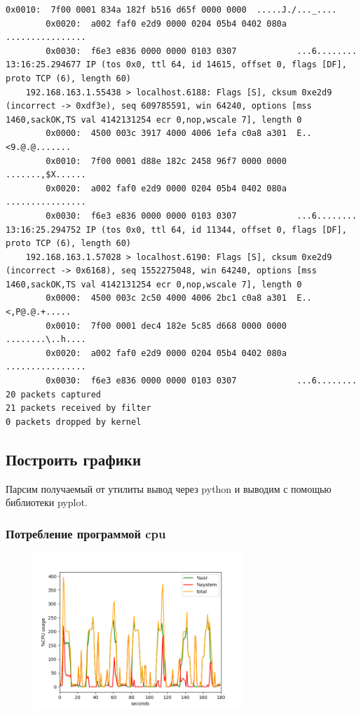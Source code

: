 \documentclass[11pt, a4paper]{article}
\begin{document}
\begin{Verbatim}[fontsize=\footnotesize,breaklines=true]
        0x0010:  7f00 0001 834a 182f b516 d65f 0000 0000  .....J./..._....
        0x0020:  a002 faf0 e2d9 0000 0204 05b4 0402 080a  ................
        0x0030:  f6e3 e836 0000 0000 0103 0307            ...6........
13:16:25.294677 IP (tos 0x0, ttl 64, id 14615, offset 0, flags [DF], proto TCP (6), length 60)
    192.168.163.1.55438 > localhost.6188: Flags [S], cksum 0xe2d9 (incorrect -> 0xdf3e), seq 609785591, win 64240, options [mss 1460,sackOK,TS val 4142131254 ecr 0,nop,wscale 7], length 0
        0x0000:  4500 003c 3917 4000 4006 1efa c0a8 a301  E..<9.@.@.......
        0x0010:  7f00 0001 d88e 182c 2458 96f7 0000 0000  .......,$X......
        0x0020:  a002 faf0 e2d9 0000 0204 05b4 0402 080a  ................
        0x0030:  f6e3 e836 0000 0000 0103 0307            ...6........
13:16:25.294752 IP (tos 0x0, ttl 64, id 11344, offset 0, flags [DF], proto TCP (6), length 60)
    192.168.163.1.57028 > localhost.6190: Flags [S], cksum 0xe2d9 (incorrect -> 0x6168), seq 1552275048, win 64240, options [mss 1460,sackOK,TS val 4142131254 ecr 0,nop,wscale 7], length 0
        0x0000:  4500 003c 2c50 4000 4006 2bc1 c0a8 a301  E..<,P@.@.+.....
        0x0010:  7f00 0001 dec4 182e 5c85 d668 0000 0000  ........\..h....
        0x0020:  a002 faf0 e2d9 0000 0204 05b4 0402 080a  ................
        0x0030:  f6e3 e836 0000 0000 0103 0307            ...6........
20 packets captured
21 packets received by filter
0 packets dropped by kernel
\end{Verbatim}

\subsection{Построить графики}

\noindent Парсим получаемый от утилиты вывод через python и выводим с помощью библиотеки pyplot.

\subsubsection*{Потребление программой cpu}


\begin{figure}[h]
  \centering
  \includegraphics[width=0.7\textwidth]{fig-cpu-1.png}
\end{figure}
\end{document}

